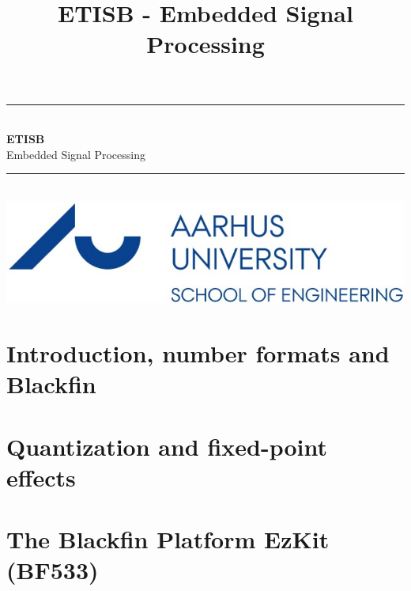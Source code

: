 \documentclass[12pt,a4paper,danish]{book}
\title{ETISB - Embedded Signal Processing}
\newcommand{\HRule}{\rule{\linewidth}{0.5mm}}
\begin{document}
\begin{titlepage}
	\clearpage\thispagestyle{empty}
	\begin{center}
		\HRule \\[0.4cm]
		{\huge \bfseries ETISB} \\[.3cm] {\huge Embedded Signal Processing}\\[0cm]
		\HRule \\[3.4cm]
		\includegraphics[width=0.5\linewidth]{graphics/au}
	\end{center}
\end{titlepage}

\tableofcontents

\chapter{Introduction, number formats and Blackfin}


\chapter{Quantization and fixed-point effects}


\chapter{The Blackfin Platform EzKit (BF533)}

\end{document}
